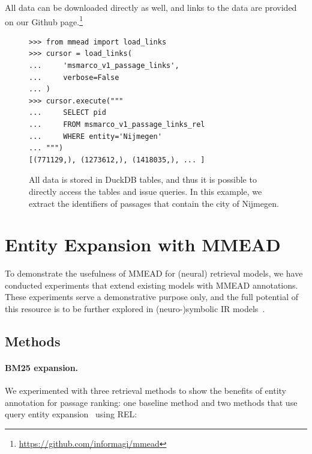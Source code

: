 All data can be downloaded directly as well, and links to the data are provided on our Github page.\footnote{\url{https://github.com/informagi/mmead}}

\begin{figure}
	\begin{verbatim}
>>> from mmead import load_links
>>> cursor = load_links(
...     'msmarco_v1_passage_links',
...     verbose=False
... )
>>> cursor.execute("""
...     SELECT pid 
...     FROM msmarco_v1_passage_links_rel 
...     WHERE entity='Nijmegen'
... """)
[(771129,), (1273612,), (1418035,), ... ]
	\end{verbatim}
	\caption{All data is stored in DuckDB tables, and thus it is possible to directly access the tables and issue queries. In this example, we extract the identifiers of passages that contain the city of Nijmegen.}
	\label{fig:sql_engine}
\end{figure}

\section{Entity Expansion with MMEAD}
To demonstrate the usefulness of MMEAD for (neural) retrieval models, we have conducted experiments that extend existing models with MMEAD annotations.
These experiments serve a demonstrative purpose only, and the full potential of this resource is to be further explored in (neuro-)symbolic IR models~\citep{Gerritse:2022:EMBERT,Tran:2022:DRE}.

\subsection{Methods}

\paragraph{BM25 expansion.} We experimented with three retrieval methods to show the benefits of entity annotation for passage ranking: one baseline method and two methods that use query entity expansion~\citep{Shehata} using REL:

